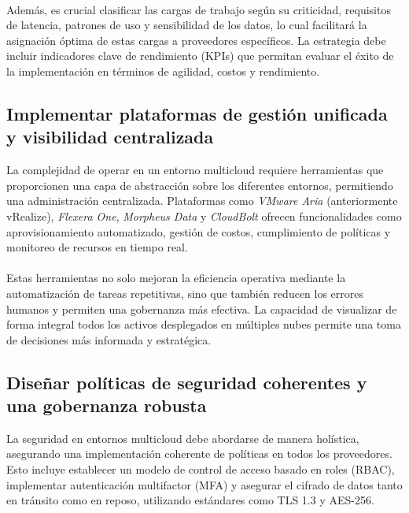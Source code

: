 {            \paragraph{}Además, es crucial clasificar las cargas de trabajo según su criticidad, requisitos de latencia, patrones de uso y sensibilidad de los datos, lo cual facilitará la asignación óptima de estas cargas a proveedores específicos. La estrategia debe incluir indicadores clave de rendimiento (KPIs) que permitan evaluar el éxito de la implementación en términos de agilidad, costos y rendimiento.
            
        \subsection{Implementar plataformas de gestión unificada y visibilidad centralizada}
            La complejidad de operar en un entorno multicloud requiere herramientas que proporcionen una capa de abstracción sobre los diferentes entornos, permitiendo una administración centralizada. Plataformas como \textit{VMware Aria} (anteriormente vRealize), \textit{Flexera One}, \textit{Morpheus Data} y \textit{CloudBolt} ofrecen funcionalidades como aprovisionamiento automatizado, gestión de costos, cumplimiento de políticas y monitoreo de recursos en tiempo real.
            
            \paragraph{}Estas herramientas no solo mejoran la eficiencia operativa mediante la automatización de tareas repetitivas, sino que también reducen los errores humanos y permiten una gobernanza más efectiva. La capacidad de visualizar de forma integral todos los activos desplegados en múltiples nubes permite una toma de decisiones más informada y estratégica.
            
        \subsection{Diseñar políticas de seguridad coherentes y una gobernanza robusta}
            La seguridad en entornos multicloud debe abordarse de manera holística, asegurando una implementación coherente de políticas en todos los proveedores. Esto incluye establecer un modelo de control de acceso basado en roles (RBAC), implementar autenticación multifactor (MFA) y asegurar el cifrado de datos tanto en tránsito como en reposo, utilizando estándares como TLS 1.3 y AES-256.
            
}
